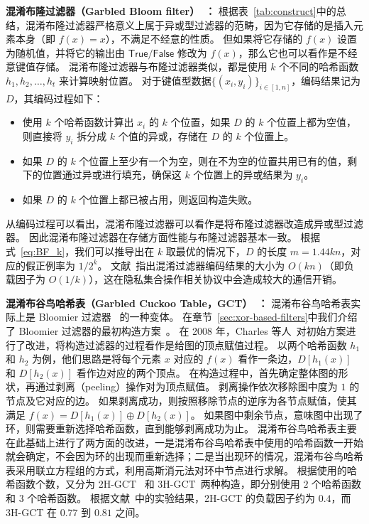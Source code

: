 \textbf{混淆布隆过滤器（Garbled Bloom filter）~\cite{dong2013when}：}
根据表~\ref{tab:construct}中的总结，混淆布隆过滤器严格意义上属于异或型过滤器的范畴，因为它存储的是插入元素本身（即 $f(x) = x$），不满足不经意的性质。
但如果将它存储的 $f(x)$ 设置为随机值，并将它的输出由 $\mathsf{True}/\mathsf{False}$ 修改为 $f(x)$，那么它也可以看作是不经意键值存储。
混淆布隆过滤器与布隆过滤器类似，都是使用 $k$ 个不同的哈希函数 $h_1, h_2, \dots, h_t$ 来计算映射位置。
对于键值型数据$\{(x_i, y_i)\}_{i\in [1, n]}$，编码结果记为 $D$，其编码过程如下：
\begin{itemize}
  \item 使用 $k$ 个哈希函数计算出 $x_i$ 的 $k$ 个位置，如果 $D$ 的 $k$ 个位置上都为空值，则直接将 $y_i$ 拆分成 $k$ 个值的异或，存储在 $D$ 的 $k$ 个位置上。
  \item 如果 $D$ 的 $k$ 个位置上至少有一个为空，则在不为空的位置共用已有的值，剩下的位置通过异或进行填充，确保这 $k$ 个位置上的异或结果为 $y_i$。
  \item 如果 $D$ 的 $k$ 个位置上都已被占用，则返回构造失败。
\end{itemize}
从编码过程可以看出，混淆布隆过滤器可以看作是将布隆过滤器改造成异或型过滤器。
因此混淆布隆过滤器在存储方面性能与布隆过滤器基本一致。
根据式~\ref{eq:BF_k}，我们可以推导出在 $k$ 取最优的情况下，$D$ 的长度 $m=1.44 kn$，对应的假正例率为 $1/2^k$。
文献~\cite{garimella2021oblivious}指出混淆过滤器编码结果的大小为 $O(kn)$（即负载因子为 $O(1/k)$），这在隐私集合操作相关协议中会造成较大的通信开销。

\textbf{混淆布谷鸟哈希表（Garbled Cuckoo Table，GCT）~\cite{pinkas2020psi,garimella2021oblivious}：}
混淆布谷鸟哈希表实际上是 Bloomier 过滤器~\cite{charles2008bloomier} 的一种变体。
在章节~\ref{sec:xor-based-filters}中我们介绍了 Bloomier 过滤器的最初构造方案~\cite{chazelle2004bloomier}。
在 2008 年，Charles 等人~\cite{charles2008bloomier}对初始方案进行了改进，将构造过滤器的过程看作是给图的顶点赋值过程。
以两个哈希函数 $h_1$ 和 $h_2$ 为例，他们思路是将每个元素 $x$ 对应的 $f(x)$ 看作一条边，$D[h_1(x)]$ 和 $D[h_2(x)]$ 看作边对应的两个顶点。
在构造过程中，首先确定整体图的形状，再通过剥离（peeling）操作对为顶点赋值。
剥离操作依次移除图中度为 $1$ 的节点及它对应的边。
如果剥离成功，则按照移除节点的逆序为各节点赋值，使其满足 $f(x) = D[h_1(x)] \oplus D[h_2(x)]$。
如果图中剩余节点，意味图中出现了环，则需要重新选择哈希函数，直到能够剥离成功为止。
混淆布谷鸟哈希表主要在此基础上进行了两方面的改进，一是混淆布谷鸟哈希表中使用的哈希函数一开始就会确定，不会因为环的出现而重新选择；二是当出现环的情况，混淆布谷鸟哈希表采用联立方程组的方式，利用高斯消元法对环中节点进行求解。
根据使用的哈希函数个数，又分为 2H-GCT~\cite{pinkas2020psi} 和 3H-GCT~\cite{garimella2021oblivious}两种构造，即分别使用 $2$ 个哈希函数和 $3$ 个哈希函数。
根据文献~\cite{bienstock2023NearOptimal}中的实验结果，2H-GCT 的负载因子约为 $0.4$，而 3H-GCT 在 $0.77$ 到 $0.81$ 之间。

